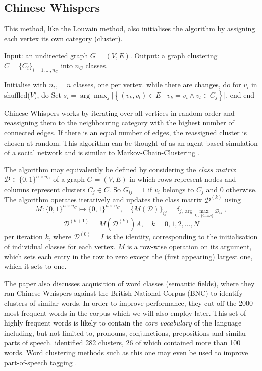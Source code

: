 \documentclass[12pt, a4paper]{article}
\begin{document}
  \subsection{Chinese Whispers}
  \label{sec:cw}
  This method, like the Louvain method, also initialises the algorithm by assigning each vertex its own category (cluster).

  \begin{algorithm}[language=pseudo, caption={\centering The \textit{Chinese Whispers} algorithm due to \cite{cw-biemann}}]
Input: an undirected graph $G = (V, E)$.
Output: a graph clustering $C = \{C_i\}_{i=1, ..., n_C}$ into $n_C$ classes.

Initialise with $n_C = n$ classes, one per vertex.
while there are changes, do
  for $v_i$ in shuffled($V$), do
    Set $s_i = \arg\max_{j} \big|\left\{(v_k, v_l) \in E \;|\; v_k = v_i \wedge v_l \in C_j\right\}\big|$.
  end
end
  \end{algorithm}

  Chinese Whispers works by iterating over all vertices in random order and reassigning them to the neighbouring category with the highest number of connected edges. If there is an equal number of edges, the reassigned cluster is chosen at random.
  This algorithm can be thought of as an agent-based simulation of a social network \parencite{cw-biemann} and is similar to Markov-Chain-Clustering \parencite{van-dongen, fortunato}.

  The algorithm may equivalently be defined by considering the \textit{class matrix} $\mathcal{D} \in \{0, 1\}^{n \times n_C}$ of a graph $G = (V, E)$ in which rows represent nodes and columns represent clusters $C_j \in C$.
  So $G_{ij} = 1$ if $v_i$ belongs to $C_j$ and $0$ otherwise.
  The algorithm operates iteratively and updates the class matrix $\mathcal{D}^{(k)}$ using
  $$M: \{0, 1\}^{n \times n_C} \mapsto \{0, 1\}^{n \times n_C}, \quad \{M(\mathcal{D})\}_{ij} = \delta_{j,\arg\max_{k\in \{0...n_C\}} \mathcal{D}_{ik}}\,,$$
  $$\mathcal{D}^{(k+1)} = M(\mathcal{D}^{(k)}) A, \quad k = 0, 1, 2, ..., N$$
  per iteration $k$, where $\mathcal{D}^{(0)} = I$ is the identity, corresponding to the initialisation of individual classes for each vertex.
  $M$ is a row-wise operation on its argument, which sets each entry in the row to zero except the (first appearing) largest one, which it sets to one.

  The paper also discusses acquisition of word classes (semantic fields), where they ran Chinese Whispers against the British National Corpus (BNC) to identify clusters of similar words.
  In order to improve performance, they cut off the 2000 most frequent words in the corpus which we will also employ later.
  This set of highly frequent words is likely to contain the \textit{core vocabulary} of the language including, but not limited to, pronouns, conjunctions, prepositions and similar parts of speech.
  \cite{cw-biemann} identified 282 clusters, 26 of which contained more than 100 words.
  Word clustering methods such as this one may even be used to improve part-of-speech tagging \parencite{ushioda-improved-pos-tagging}.
\end{document}
